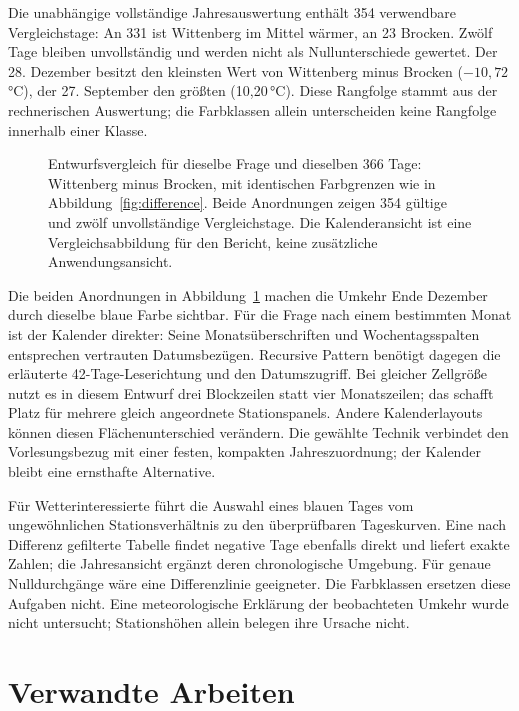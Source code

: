 \documentclass[usegeometry=true]{scrartcl}
\begin{document}
Die unabhängige vollständige Jahresauswertung enthält 354 verwendbare
Vergleichstage: An 331 ist Wittenberg im Mittel wärmer, an 23 Brocken.
Zwölf Tage bleiben unvollständig und werden nicht als Nullunterschiede
gewertet. Der 28. Dezember besitzt den kleinsten Wert von Wittenberg minus
Brocken ($-10{,}72$\,°C), der 27. September den größten
(10,20\,°C). Diese Rangfolge stammt aus der rechnerischen Auswertung;
die Farbklassen allein unterscheiden keine Rangfolge innerhalb einer Klasse.

\begin{figure}[htbp]
  \centering
  
  \caption{Entwurfsvergleich für dieselbe Frage und dieselben 366 Tage:
  Wittenberg minus Brocken, mit identischen Farbgrenzen wie in
  Abbildung~\ref{fig:difference}. Beide Anordnungen zeigen 354 gültige
  und zwölf unvollständige Vergleichstage. Die Kalenderansicht ist eine
  Vergleichsabbildung für den Bericht, keine zusätzliche Anwendungsansicht.}
  \label{fig:calendar-comparison}
\end{figure}
Die beiden Anordnungen in Abbildung~\ref{fig:calendar-comparison} machen
die Umkehr Ende Dezember durch dieselbe blaue Farbe sichtbar. Für die
Frage nach einem bestimmten Monat ist der Kalender direkter: Seine
Monatsüberschriften und Wochentagsspalten entsprechen vertrauten
Datumsbezügen. Recursive Pattern benötigt dagegen die erläuterte
42-Tage-Leserichtung und den Datumszugriff. Bei gleicher Zellgröße
nutzt es in diesem Entwurf drei Blockzeilen statt vier Monatszeilen;
das schafft Platz für mehrere gleich angeordnete Stationspanels.
Andere Kalenderlayouts können diesen Flächenunterschied verändern.
Die gewählte Technik verbindet den Vorlesungsbezug mit einer festen,
kompakten Jahreszuordnung; der Kalender bleibt eine ernsthafte Alternative.

Für Wetterinteressierte führt die Auswahl eines blauen Tages vom
ungewöhnlichen Stationsverhältnis zu den überprüfbaren Tageskurven.
Eine nach Differenz gefilterte Tabelle findet negative Tage ebenfalls
direkt und liefert exakte Zahlen; die Jahresansicht ergänzt deren
chronologische Umgebung. Für genaue Nulldurchgänge wäre eine
Differenzlinie geeigneter. Die Farbklassen ersetzen diese Aufgaben nicht.
Eine meteorologische Erklärung der beobachteten Umkehr wurde nicht
untersucht; Stationshöhen allein belegen ihre Ursache nicht.

\section{Verwandte Arbeiten}
\end{document}
